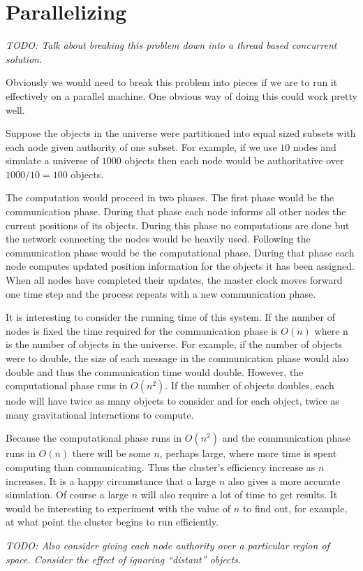 
\section{Parallelizing}
\label{sec:parallelizing}

\textit{TODO: Talk about breaking this problem down into a thread based concurrent solution.}

Obviously we would need to break this problem into pieces if we are to run it effectively on a
parallel machine. One obvious way of doing this could work pretty well.

Suppose the objects in the universe were partitioned into equal sized subsets with each node
given authority of one subset. For example, if we use $10$ nodes and simulate a universe of
$1000$ objects then each node would be authoritative over $1000/10 = 100$ objects.

The computation would proceed in two phases. The first phase would be the communication phase.
During that phase each node informs all other nodes the current positions of its objects. During
this phase no computations are done but the network connecting the nodes would be heavily used.
Following the communication phase would be the computational phase. During that phase each node
computes updated position information for the objects it has been assigned. When all nodes have
completed their updates, the master clock moves forward one time step and the process repeats
with a new communication phase.

It is interesting to consider the running time of this system. If the number of nodes is fixed
the time required for the communication phase is $O(n)$ where n is the number of objects in the
universe. For example, if the number of objects were to double, the size of each message in the
communication phase would also double and thus the communication time would double. However, the
computational phase runs in $O(n^2)$. If the number of objects doubles, each node will have
twice as many objects to consider and for each object, twice as many gravitational interactions
to compute.

Because the computational phase runs in $O(n^2)$ and the communication phase runs in $O(n)$
there will be some $n$, perhaps large, where more time is spent computing than communicating.
Thus the cluster's efficiency increase as $n$ increases. It is a happy circumstance that a large
$n$ also gives a more accurate simulation. Of course a large $n$ will also require a lot of time
to get results. It would be interesting to experiment with the value of $n$ to find out, for
example, at what point the cluster begins to run efficiently.

\textit{TODO: Also consider giving each node authority over a particular region of space.
  Consider the effect of ignoring ``distant'' objects.}
